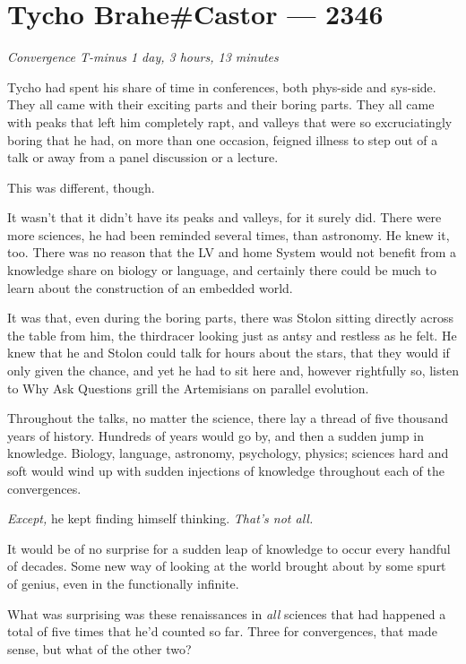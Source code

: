 \hypertarget{tycho-brahecastor-2346}{%
\chapter{Tycho Brahe\#Castor — 2346}\label{tycho-brahecastor-2346}}

\begin{center}
\emph{Convergence T-minus 1 day, 3 hours, 13 minutes}
\end{center}

\noindent Tycho had spent his share of time in conferences, both phys-side and sys-side. They all came with their exciting parts and their boring parts. They all came with peaks that left him completely rapt, and valleys that were so excruciatingly boring that he had, on more than one occasion, feigned illness to step out of a talk or away from a panel discussion or a lecture.

This was different, though.

It wasn't that it didn't have its peaks and valleys, for it surely did. There were more sciences, he had been reminded several times, than astronomy. He knew it, too. There was no reason that the LV and home System would not benefit from a knowledge share on biology or language, and certainly there could be much to learn about the construction of an embedded world.

It was that, even during the boring parts, there was Stolon sitting directly across the table from him, the thirdracer looking just as antsy and restless as he felt. He knew that he and Stolon could talk for hours about the stars, that they would if only given the chance, and yet he had to sit here and, however rightfully so, listen to Why Ask Questions grill the Artemisians on parallel evolution.

Throughout the talks, no matter the science, there lay a thread of five thousand years of history. Hundreds of years would go by, and then a sudden jump in knowledge. Biology, language, astronomy, psychology, physics; sciences hard and soft would wind up with sudden injections of knowledge throughout each of the convergences.

\emph{Except,} he kept finding himself thinking. \emph{That's not all.}

It would be of no surprise for a sudden leap of knowledge to occur every handful of decades. Some new way of looking at the world brought about by some spurt of genius, even in the functionally infinite.

What was surprising was these renaissances in \emph{all} sciences that had happened a total of five times that he'd counted so far. Three for convergences, that made sense, but what of the other two?

